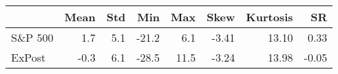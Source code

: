 \begin{tabular}{lrrrrrrr}
\hline
         &   Mean &   Std &   Min &   Max &   Skew &   Kurtosis &    SR \\
\hline
 S\&P 500 &    1.7 &   5.1 & -21.2 &   6.1 &  -3.41 &      13.10 &  0.33 \\
 ExPost  &   -0.3 &   6.1 & -28.5 &  11.5 &  -3.24 &      13.98 & -0.05 \\
\hline
\end{tabular}